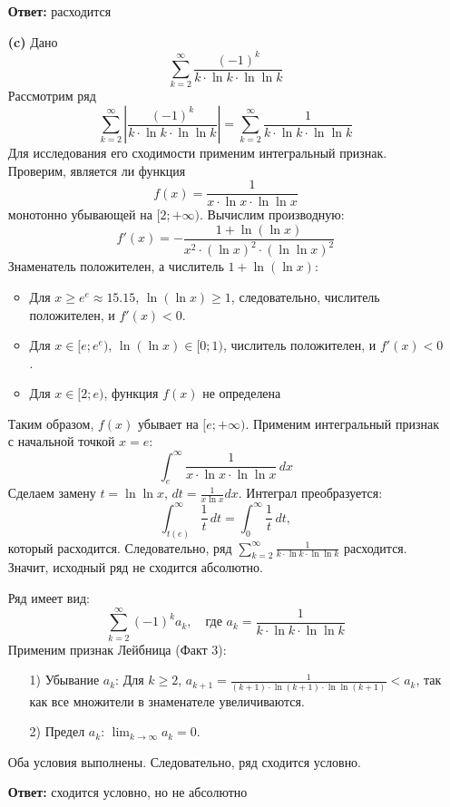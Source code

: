 \documentclass[a4paper]{article}
\renewcommand{\geq}{\geqslant}
\begin{document}
\begin{enumerate}
\textbf{Ответ: } расходится\\



\item[\textbf{(c)}]Дано
$$\sum_{k=2}^{\infty} \frac{(-1)^k}{k \cdot \ln k \cdot \ln \ln k} $$
Рассмотрим ряд
\[
\sum_{k=2}^{\infty} \left| \frac{(-1)^k}{k \cdot \ln k \cdot \ln \ln k} \right| 
= \sum_{k=2}^{\infty} \frac{1}{k \cdot \ln k \cdot \ln \ln k}
\]
Для исследования его сходимости применим интегральный признак. Проверим, является ли функция
\[
f(x) = \frac{1}{x \cdot \ln x \cdot \ln \ln x}
\]
монотонно убывающей на $[2; +\infty)$. Вычислим производную:
\[
f'(x) = -\frac{1 + \ln(\ln x)}{x^2 \cdot (\ln x)^2 \cdot (\ln \ln x)^2}
\]
Знаменатель положителен, а числитель $1 + \ln(\ln x)$:
\begin{itemize}
  \item Для $x \geq e^e \approx 15.15$, $\ln(\ln x) \geq 1$, следовательно, числитель положителен, и $f'(x) < 0$.
  \item Для $x \in [e; e^e)$, $\ln(\ln x) \in [0; 1)$, числитель положителен, и $f'(x) < 0$.
  \item Для $x \in [2; e)$, функция $f(x)$ не определена 
\end{itemize}
Таким образом, $f(x)$ убывает на $[e; +\infty)$. Применим интегральный признак с 
начальной точкой $x = e$:
\[
\int_{e}^{\infty} \frac{1}{x \cdot \ln x \cdot \ln \ln x} \, dx
\]
Сделаем замену $t = \ln \ln x$, $dt = \frac{1}{x \ln x} dx$. Интеграл преобразуется:
\[
\int_{t(e)}^{\infty} \frac{1}{t} \, dt = \int_{0}^{\infty} \frac{1}{t} \, dt,
\]
который расходится. Следовательно, ряд
  $\sum_{k=2}^{\infty} \frac{1}{k \cdot \ln k \cdot \ln \ln k}$ расходится.
  Значит, исходный ряд не сходится абсолютно.

Ряд имеет вид:
\[
\sum_{k=2}^{\infty} (-1)^k a_k, \quad \text{где } a_k = 
\frac{1}{k \cdot \ln k \cdot \ln \ln k}
\]
Применим признак Лейбница (Факт 3):
\begin{enumerate}
  \item[1)] Убывание $a_k$: Для $k \geq 2$, $a_{k+1} = \frac{1}{(k+1) 
  \cdot \ln(k+1) \cdot \ln \ln(k+1)} < a_k$, так как все
  множители в знаменателе увеличиваются.
  \item[2)] Предел $a_k$: $\lim_{k \to \infty} a_k = 0$.
\end{enumerate}

Оба условия выполнены. Следовательно, ряд сходится условно.

\textbf{Ответ: } сходится условно, но не абсолютно\\



\end{enumerate}
\end{document}
